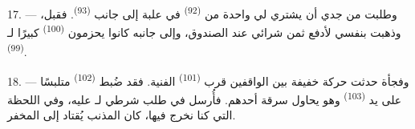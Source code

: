 \VUsaut{4.4mm}
\VUsaut{2.8mm}

17. --- وطلبت من جدي أن يشتري لي واحدة من 
\textsuperscript{(92)} في علبة إلى جانب  \textsuperscript{(93)}.
فقبل، وذهبت بنفسي لأدفع ثمن شرائي عند الصندوق، وإلى جانبه كانوا يحزمون
 \textsuperscript{(100)} كبيرًا لـ \textsuperscript{(99)}.

18. --- وفجأة حدثت حركة خفيفة بين الواقفين قرب 
\textsuperscript{(101)} الفنية. فقد ضُبط  \textsuperscript{(102)} متلبسًا
على يد  \textsuperscript{(103)} وهو يحاول سرقة أحدهم.
فأُرسل في طلب شرطي لـ عليه، وفي اللحظة التي كنا نخرج فيها،
كان المذنب يُقتاد إلى المخفر.
\VUsaut{6.0mm}
\VUfilet{22mm}
